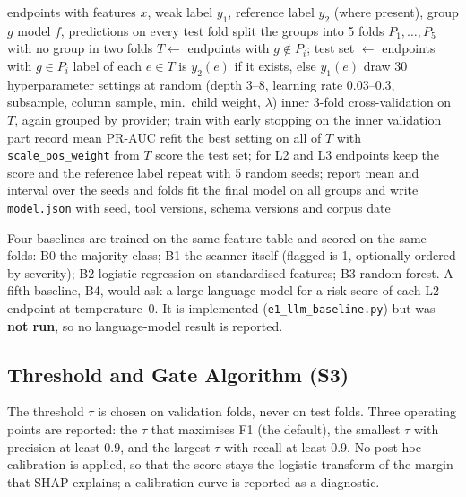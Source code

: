 \documentclass[conference]{IEEEtran}
\begin{document}
\begin{algorithm}[!t]
\caption{Grouped training and tuning (T4)}
\label{alg:train}
\footnotesize
\begin{algorithmic}[1]
\REQUIRE endpoints with features $x$, weak label $y_1$, reference label $y_2$ (where present), group $g$
\ENSURE model $f$, predictions on every test fold
\STATE split the groups into 5 folds $P_1,\dots,P_5$ with no group in two folds
  \STATE $T\leftarrow$ endpoints with $g\notin P_i$;\; test set $\leftarrow$ endpoints with $g\in P_i$
  \STATE label of each $e\in T$ is $y_2(e)$ if it exists, else $y_1(e)$
  \STATE draw 30 hyperparameter settings at random (depth 3--8, learning rate 0.03--0.3, subsample, column sample, min.\ child weight, $\lambda$)
    \STATE inner 3-fold cross-validation on $T$, again grouped by provider; train with early stopping on the inner validation part
    \STATE record mean PR-AUC
  \ENDFOR
  \STATE refit the best setting on all of $T$ with \texttt{scale\_pos\_weight} from $T$
  \STATE score the test set; for L2 and L3 endpoints keep the score and the reference label
\ENDFOR
\STATE repeat with 5 random seeds; report mean and interval over the seeds and folds
\STATE fit the final model on all groups and write \texttt{model.json} with seed, tool versions, schema versions and corpus date
\end{algorithmic}
\end{algorithm}

Four baselines are trained on the same feature table and scored on the same folds:
B0 the majority class; B1 the scanner itself (flagged is 1, optionally ordered by severity);
B2 logistic regression on standardised features; B3 random forest. A fifth baseline, B4, would ask a large language model for a risk score of each L2 endpoint at temperature~0. It is implemented (\texttt{e1\_llm\_baseline.py}) but was \textbf{not run}, so no language-model result is reported.

\subsection{Threshold and Gate Algorithm (S3)}
The threshold $\tau$ is chosen on validation folds, never on test folds. Three operating
points are reported: the $\tau$ that maximises F1 (the default), the smallest $\tau$ with
precision at least 0.9, and the largest $\tau$ with recall at least 0.9. No post-hoc
calibration is applied, so that the score stays the logistic transform of the margin that SHAP
explains; a calibration curve is reported as a diagnostic.
\end{document}
